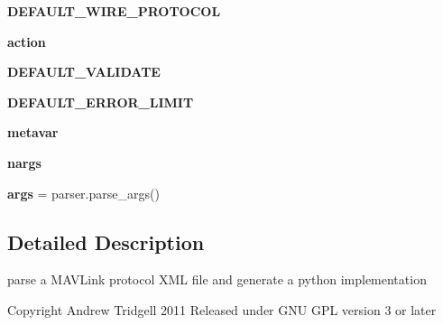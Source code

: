 \begin{DoxyCompactItemize}
{\bfseries D\+E\+F\+A\+U\+L\+T\+\_\+\+W\+I\+R\+E\+\_\+\+P\+R\+O\+T\+O\+C\+OL}
\item 
\mbox{\label{namespacepymavlink_1_1tools_1_1mavgen_ad1a13c732d7b5b8ed0b947b8676ab432}} 
{\bfseries action}
\item 
\mbox{\label{namespacepymavlink_1_1tools_1_1mavgen_a7891afd39197c66f59dea5530e280212}} 
{\bfseries D\+E\+F\+A\+U\+L\+T\+\_\+\+V\+A\+L\+I\+D\+A\+TE}
\item 
\mbox{\label{namespacepymavlink_1_1tools_1_1mavgen_a0a8ea614bdce04c99b1f5484cb3dba54}} 
{\bfseries D\+E\+F\+A\+U\+L\+T\+\_\+\+E\+R\+R\+O\+R\+\_\+\+L\+I\+M\+IT}
\item 
\mbox{\label{namespacepymavlink_1_1tools_1_1mavgen_a907e2e63bff773d6e4b6ab4db00af057}} 
{\bfseries metavar}
\item 
\mbox{\label{namespacepymavlink_1_1tools_1_1mavgen_a3689a5bff8d0728f32f03b892691f98e}} 
{\bfseries nargs}
\item 
\mbox{\label{namespacepymavlink_1_1tools_1_1mavgen_a888343496d6a4a5f4101ab9385211105}} 
{\bfseries args} = parser.\+parse\+\_\+args()
\end{DoxyCompactItemize}


\subsection{Detailed Description}
\begin{DoxyVerb}parse a MAVLink protocol XML file and generate a python implementation

Copyright Andrew Tridgell 2011
Released under GNU GPL version 3 or later\end{DoxyVerb}
 